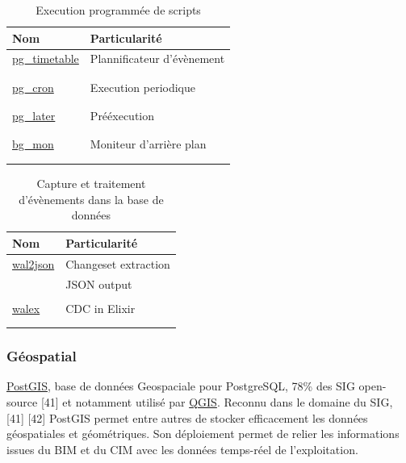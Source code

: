 \documentclass[a4paper,12pt]{article}
\begin{document}
\begin{multicols*}{2}
\begin{table}[H]
\caption{Execution programmée de scripts}
\centering
\begin{tabular}{ll}
Nom & Particularité\\
\hline
\href{https://github.com/cybertec-postgresql/pg\_timetable}{pg\_timetable} & Plannificateur d'évènement\\
 & \\
 & \\
\href{https://github.com/citusdata/pg\_cron}{pg\_cron} & Execution periodique\\
 & \\
 & \\
\href{https://github.com/tembo-io/pg\_later}{pg\_later} & Prééxecution\\
 & \\
 & \\
\href{https://github.com/CyberDem0n/bg\_mon}{bg\_mon} & Moniteur d'arrière plan\\
 & \\
 & \\
\end{tabular}
\end{table}

\begin{table}[H]
\caption{Capture et traitement d'évènements dans la base de données}
\centering
\begin{tabular}{ll}
Nom & Particularité\\
\hline
\href{https://github.com/eulerto/wal2json}{wal2json} & Changeset extraction\\
 & JSON output\\
 & \\
\href{https://github.com/cpursley/walex}{walex} & CDC in Elixir\\
 & \\
 & \\
\end{tabular}
\end{table}
\subsubsection*{Géospatial}
\label{sec:org394647c}

\href{https://github.com/postgis/postgis}{PostGIS}, base de données Geospaciale pour PostgreSQL, 78\% des SIG open-source [41] et notamment utilisé par \href{https://qgis.org/}{QGIS}.
Reconnu dans le domaine du SIG, [41] [42] PostGIS permet entre autres de stocker efficacement les données géospatiales et géométriques. Son déploiement permet de relier les informations issues du BIM et du CIM avec les données temps-réel de l’exploitation.


\end{multicols*}
\end{document}
